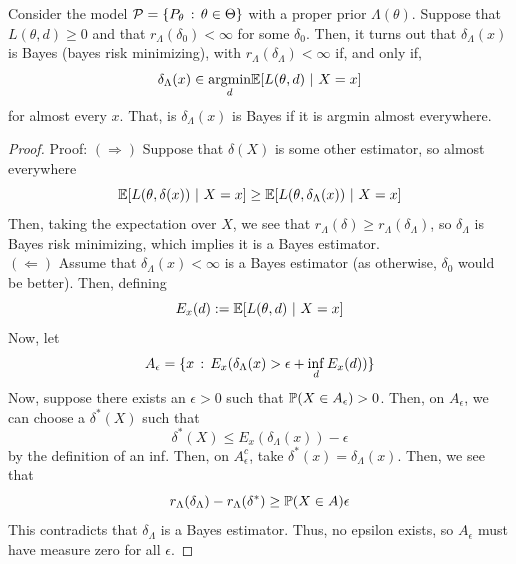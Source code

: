 \begin{lemma}
    Consider the model $\mathcal{P} = \{P_{\theta} \, :\, \theta \in \Theta\}$ with a proper prior $\Lambda(\theta)$. Suppose that $L(\theta, d) \geq 0$ and that $r_{\Lambda}(\delta_0) < \infty$ for some $\delta_0$. Then, it turns out that $\delta_{\Lambda}(x)$ is Bayes (bayes risk minimizing), with $r_{\Lambda}(\delta_{\Lambda}) < \infty$ if, and only if, 
    \[ \delta_{\Lambda}(x) \in \underset{d}{\text{argmin}}\mathbb{E}[L(\theta, d) \ |\  X = x] \]
    for almost every $x$. That, is $\delta_{\Lambda}(x)$ is Bayes if it is argmin almost everywhere.
\end{lemma}
\begin{proof}{Proof:}
    $(\Rightarrow)$ Suppose that $\delta(X)$ is some other estimator, so almost everywhere
    \[ \mathbb{E}[L(\theta, \delta(x)) \ |\  X = x] \geq \mathbb{E}[L(\theta, \delta_{\Lambda}(x)) \ |\  X = x] \]
    Then, taking the expectation over $X$, we see that $r_{\Lambda}(\delta) \geq r_{\Lambda}(\delta_{\Lambda})$, so $\delta_{\Lambda}$ is Bayes risk minimizing, which implies it is a Bayes estimator.  \\

    $(\Leftarrow)$ Assume that $\delta_{\Lambda}(x) < \infty$ is a Bayes estimator (as otherwise, $\delta_0$ would be better). Then, defining
    \[ E_{x}(d) := \mathbb{E}[L(\theta, d) \ |\  X = x] \]
    Now, let 
    \[ A_{\epsilon} = \{x \, :\, E_{x}(\delta_{\Lambda}(x) > \epsilon + \inf_{d} E_{x}(d))\} \]
    Now, suppose there exists an $\epsilon > 0$ such that $\mathbb{P}(X \in A_{\epsilon}) > 0$. Then, on $A_{\epsilon}$, we can choose a $\delta^{*}(X)$ such that 
    \[ \delta^{*}(X) \leq E_{x}(\delta_{\Lambda}(x)) - \epsilon \]
    by the definition of an inf. Then, on $A_{\epsilon}^{c}$, take $\delta^{*}(x) = \delta_{\Lambda}(x)$. Then, we see that
    \[ r_{\Lambda}(\delta_{\Lambda}) - r_{\Lambda}(\delta^{*}) \geq \mathbb{P}(X \in A)\epsilon \]
    This contradicts that $\delta_{\Lambda}$ is a Bayes estimator. Thus, no epsilon exists, so $A_{\epsilon}$ must have measure zero for all $\epsilon$. 
\end{proof}

